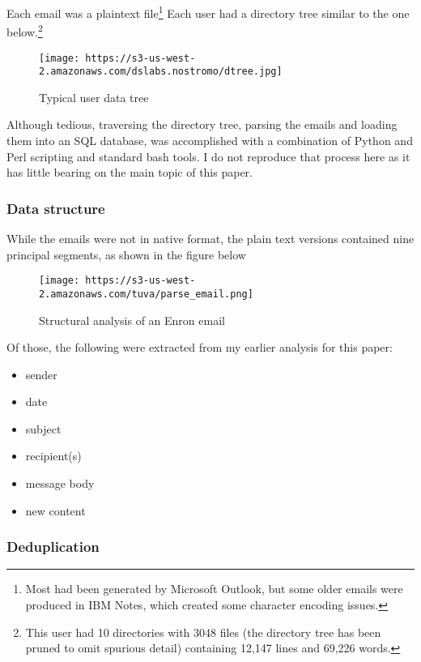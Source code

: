 \documentclass[]{article}
\providecommand{\tightlist}{%
  \setlength{\itemsep}{0pt}\setlength{\parskip}{0pt}}
\let\rmarkdownfootnote\footnote%
\def\footnote{\protect\rmarkdownfootnote}
\begin{document}
Each email was a plaintext file\footnote{Most had been generated by
  Microsoft Outlook, but some older emails were produced in IBM Notes,
  which created some character encoding issues.} Each user had a
directory tree similar to the one below.\footnote{This user had 10
  directories with 3048 files (the directory tree has been pruned to
  omit spurious detail) containing 12,147 lines and 69,226 words.}

\begin{figure}
\centering
\texttt{[image: https://s3-us-west-2.amazonaws.com/dslabs.nostromo/dtree.jpg]}
\caption{Typical user data tree}
\end{figure}

Although tedious, traversing the directory tree, parsing the emails and
loading them into an SQL database, was accomplished with a combination
of Python and Perl scripting and standard bash tools. I do not reproduce
that process here as it has little bearing on the main topic of this
paper.

\hypertarget{data-structure}{%
\subsubsection{Data structure}\label{data-structure}}

While the emails were not in native format, the plain text versions
contained nine principal segments, as shown in the figure below

\begin{figure}
\centering
\texttt{[image: https://s3-us-west-2.amazonaws.com/tuva/parse\_email.png]}
\caption{Structural analysis of an Enron email}
\end{figure}

Of those, the following were extracted from my earlier analysis for this
paper:

\begin{itemize}
\tightlist
\item
  sender
\item
  date
\item
  subject
\item
  recipient(s)
\item
  message body
\item
  new content
\end{itemize}

\hypertarget{deduplication}{%
\subsubsection{Deduplication}\label{deduplication}}
\end{document}
